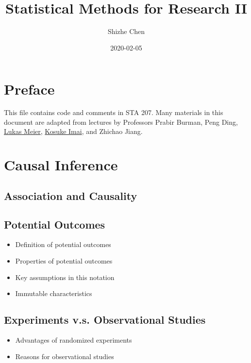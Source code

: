 \documentclass[12pt,]{book}
\title{Statistical Methods for Research II}
\author{Shizhe Chen}
\date{2020-02-05}
\providecommand{\tightlist}{%
  \setlength{\itemsep}{0pt}\setlength{\parskip}{0pt}}
\begin{document}
\maketitle

{
\setcounter{tocdepth}{1}
\tableofcontents
}
\chapter*{Preface}\label{pre}

This file contains code and comments in STA 207. Many materials in this
document are adapted from lectures by Professors Prabir Burman, Peng
Ding, \href{https://stat.ethz.ch/~meier/teaching/anova/}{Lukas Meier},
\href{https://imai.fas.harvard.edu/teaching/index.html}{Kosuke Imai},
and Zhichao Jiang.

\chapter{Causal Inference}\label{ch:causal}

\section{Association and Causality}\label{association-and-causality}

\section{Potential Outcomes}\label{potential-outcomes}

\begin{itemize}
\tightlist
\item
  Definition of potential outcomes
\item
  Properties of potential outcomes
\item
  Key assumptions in this notation
\item
  Immutable characteristics
\end{itemize}

\section{Experiments v.s. Observational
Studies}\label{experiments-v.s.-observational-studies}

\begin{itemize}
\tightlist
\item
  Advantages of randomized experiments
\item
  Reasons for observational studies
\end{itemize}
\end{document}
